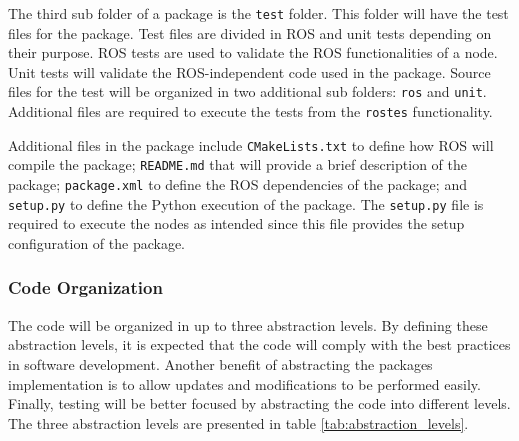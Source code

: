 \documentclass{article}
\begin{document}
The third sub folder of a package is the \texttt{test} folder. This folder will have the test files for the package. Test files are divided in ROS and unit tests depending on their purpose. ROS tests are used to 
validate the ROS functionalities of a node. Unit tests will validate the ROS-independent code used in the package. Source files for the test will be organized in two additional sub folders: \texttt{ros} and \texttt{unit}. Additional files are required to execute the tests from the \texttt{rostes} functionality.

Additional files in the package include \texttt{CMakeLists.txt} to define how ROS will compile the package; \texttt{README.md} that will provide a brief description of the package; \texttt{package.xml} to define the ROS dependencies of the package; and \texttt{setup.py} to define the Python execution of the package. The \texttt{setup.py} file is required to execute the nodes as intended since this file provides the setup configuration of the package.

\subsubsection{Code Organization}
The code will be organized in up to three abstraction levels. By defining these abstraction levels, it is expected that the code will comply with the best practices in software development. Another benefit of abstracting the packages implementation is to allow updates and modifications to be performed easily. Finally, testing will be better focused by abstracting the code into different levels. The three abstraction levels are presented in table \ref{tab:abstraction_levels}.
\end{document}
